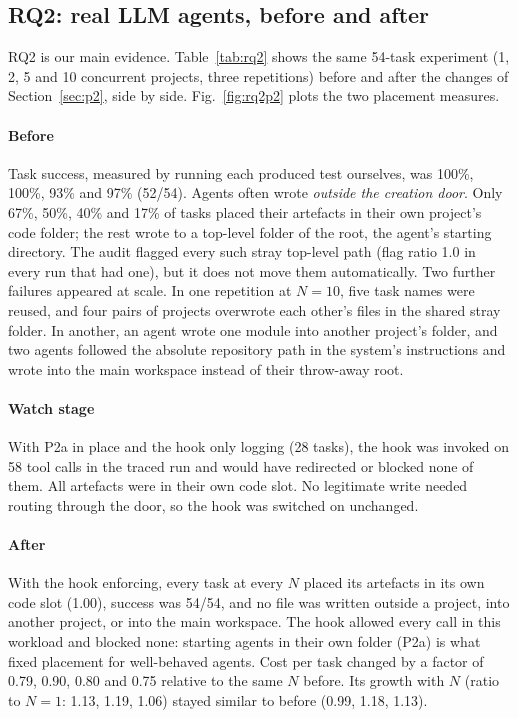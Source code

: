 \subsection{RQ2: real LLM agents, before and after}
RQ2 is our main evidence. Table~\ref{tab:rq2} shows the same 54-task experiment (1, 2, 5 and 10 concurrent projects, three repetitions) before and after the changes of Section~\ref{sec:p2}, side by side. Fig.~\ref{fig:rq2p2} plots the two placement measures.

\paragraph*{Before} Task success, measured by running each produced test ourselves, was 100\%, 100\%, 93\% and 97\% (52/54). Agents often wrote \emph{outside the creation door}. Only 67\%, 50\%, 40\% and 17\% of tasks placed their artefacts in their own project's code folder; the rest wrote to a top-level folder of the root, the agent's starting directory. The audit flagged every such stray top-level path (flag ratio 1.0 in every run that had one), but it does not move them automatically. Two further failures appeared at scale. In one repetition at $N=10$, five task names were reused, and four pairs of projects overwrote each other's files in the shared stray folder. In another, an agent wrote one module into another project's folder, and two agents followed the absolute repository path in the system's instructions and wrote into the main workspace instead of their throw-away root.

\paragraph*{Watch stage} With P2a in place and the hook only logging (28 tasks), the hook was invoked on 58 tool calls in the traced run and would have redirected or blocked none of them. All artefacts were in their own code slot. No legitimate write needed routing through the door, so the hook was switched on unchanged.

\paragraph*{After} With the hook enforcing, every task at every $N$ placed its artefacts in its own code slot (1.00), success was 54/54, and no file was written outside a project, into another project, or into the main workspace. The hook allowed every call in this workload and blocked none: starting agents in their own folder (P2a) is what fixed placement for well-behaved agents. Cost per task changed by a factor of 0.79, 0.90, 0.80 and 0.75 relative to the same $N$ before. Its growth with $N$ (ratio to $N=1$: 1.13, 1.19, 1.06) stayed similar to before (0.99, 1.18, 1.13).

